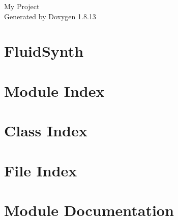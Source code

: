 \documentclass[twoside]{book}
\newcommand{\+}{\discretionary{\mbox{\scriptsize$\hookleftarrow$}}{}{}}
\newcommand{\clearemptydoublepage}{%
  \newpage{\pagestyle{empty}\cleardoublepage}%
}
\begin{document}
\hypersetup{pageanchor=false,
             bookmarksnumbered=true,
             pdfencoding=unicode
            }
\begin{titlepage}
\vspace*{7cm}
\begin{center}%
{\Large My Project }\\
\vspace*{1cm}
{\large Generated by Doxygen 1.8.13}\\
\end{center}
\end{titlepage}
\clearemptydoublepage
{}
\tableofcontents
\clearemptydoublepage
{}
\hypersetup{pageanchor=true}

\chapter{Fluid\+Synth}
\label{md_README}

\chapter{Module Index}

\chapter{Class Index}

\chapter{File Index}

\chapter{Module Documentation}


\end{document}
